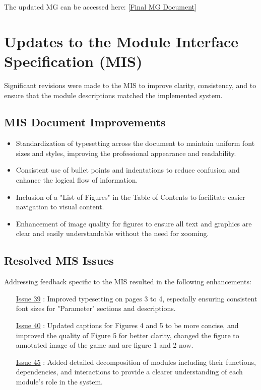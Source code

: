 \documentclass[12pt]{article}
\begin{document}
The updated MG can be accessed here:
[\href{https://github.com/XessX/Angry_Bird_Alike/blob/main/docs/Design/SoftArchitecture/MG.pdf}{Final MG Document}]

\section{Updates to the Module Interface Specification (MIS)}
Significant revisions were made to the MIS to improve clarity, consistency, and to ensure that the module descriptions matched the implemented system.

\subsection{MIS Document Improvements}
\begin{itemize}
    \item Standardization of typesetting across the document to maintain uniform font sizes and styles, improving the professional appearance and readability.
    \item Consistent use of bullet points and indentations to reduce confusion and enhance the logical flow of information.
    \item Inclusion of a "List of Figures" in the Table of Contents to facilitate easier navigation to visual content.
    \item Enhancement of image quality for figures to ensure all text and graphics are clear and easily understandable without the need for zooming.
\end{itemize}

\subsection{Resolved MIS Issues}
Addressing feedback specific to the MIS resulted in the following enhancements:
\begin{itemize}
    \item [\href{https://github.com/XessX/Angry_Bird_Alike/issues/39}{Issue 39}]: Improved typesetting on pages 3 to 4, especially ensuring consistent font sizes for "Parameter" sections and descriptions.
    \item [\href{https://github.com/XessX/Angry_Bird_Alike/issues/40}{Issue 40}]: Updated captions for Figures 4 and 5 to be more concise, and improved the quality of Figure 5 for better clarity, changed the figure to annotated image of the game and are figure 1 and 2 now.
    \item [\href{https://github.com/XessX/Angry_Bird_Alike/issues/45}{Issue 45}]: Added detailed decomposition of modules including their functions, dependencies, and interactions to provide a clearer understanding of each module's role in the system.
\end{itemize}
\end{document}
